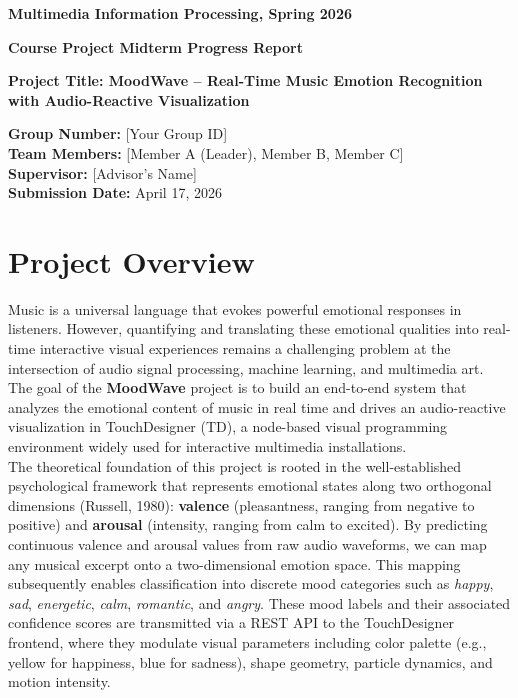\documentclass[12pt,a4paper]{article}
\begin{document}
\begin{titlepage}
    \centering
    \vspace*{2cm}
    {\Large\bfseries Multimedia Information Processing, Spring 2026\par}
    \vspace{1.5cm}
    {\Huge\bfseries Course Project Midterm Progress Report\par}
    \vspace{2cm}
    {\LARGE\bfseries Project Title: MoodWave -- Real-Time Music Emotion Recognition with Audio-Reactive Visualization\par}
    \vspace{1.5cm}
    {\large
    \textbf{Group Number:} [Your Group ID]\\[0.5em]
    \textbf{Team Members:} [Member A (Leader), Member B, Member C]\\[0.5em]
    \textbf{Supervisor:} [Advisor's Name]\\[0.5em]
    \textbf{Submission Date:} April 17, 2026\par}
    \vfill
\end{titlepage}

\tableofcontents
\newpage

\section{Project Overview}

Music is a universal language that evokes powerful emotional responses in listeners. However, quantifying and translating these emotional qualities into real-time interactive visual experiences remains a challenging problem at the intersection of audio signal processing, machine learning, and multimedia art. The goal of the \textbf{MoodWave} project is to build an end-to-end system that analyzes the emotional content of music in real time and drives an audio-reactive visualization in TouchDesigner (TD), a node-based visual programming environment widely used for interactive multimedia installations. \\

The theoretical foundation of this project is rooted in the well-established psychological framework that represents emotional states along two orthogonal dimensions (Russell, 1980): \textbf{valence} (pleasantness, ranging from negative to positive) and \textbf{arousal} (intensity, ranging from calm to excited). By predicting continuous valence and arousal values from raw audio waveforms, we can map any musical excerpt onto a two-dimensional emotion space. This mapping subsequently enables classification into discrete mood categories such as \textit{happy}, \textit{sad}, \textit{energetic}, \textit{calm}, \textit{romantic}, and \textit{angry}. These mood labels and their associated confidence scores are transmitted via a REST API to the TouchDesigner frontend, where they modulate visual parameters including color palette (e.g., yellow for happiness, blue for sadness), shape geometry, particle dynamics, and motion intensity. \\
\end{document}
